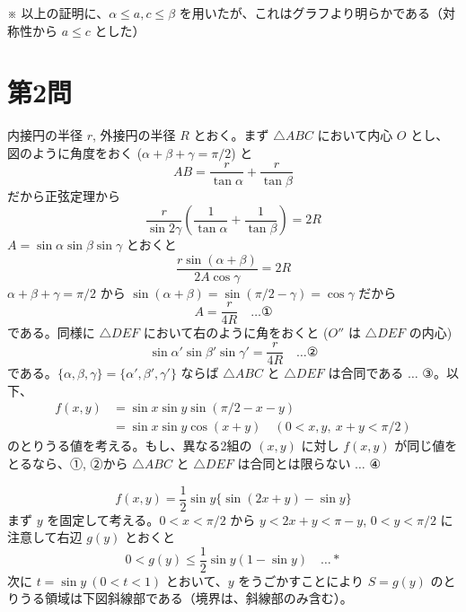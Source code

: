 \documentclass[../main.tex]{subfiles}
\begin{document}
\begin{center}
\end{center}
\noindent
※ 以上の証明に、$\alpha \le a, c \le \beta$ を用いたが、これはグラフより明らかである（対称性から $a \le c$ とした）

\newpage

\section*{第2問}

\noindent
[\textbf{解}] 内接円の半径 $r$, 外接円の半径 $R$ とおく。まず $\triangle ABC$ において内心 $O$ とし、図のように角度をおく ($\alpha+\beta+\gamma = \pi/2$) と
\[
  AB = \frac{r}{\tan \alpha} + \frac{r}{\tan \beta}
\]
だから正弦定理から
\[
  \frac{r}{\sin 2\gamma} \left( \frac{1}{\tan \alpha} + \frac{1}{\tan \beta} \right) = 2R
\]
$A = \sin \alpha \sin \beta \sin \gamma$ とおくと
\[
  \frac{r \sin(\alpha+\beta)}{2A \cos \gamma} = 2R
\]
$\alpha+\beta+\gamma = \pi/2$ から $\sin(\alpha+\beta) = \sin(\pi/2-\gamma) = \cos \gamma$ だから
\[
  A = \frac{r}{4R} \quad \dots \text{①}
\]
である。同様に $\triangle DEF$ において右のように角をおくと ($O''$ は $\triangle DEF$ の内心)
\[
  \sin \alpha' \sin \beta' \sin \gamma' = \frac{r}{4R} \quad \dots \text{②}
\]
である。$\{\alpha, \beta, \gamma\} = \{\alpha', \beta', \gamma'\}$ ならば $\triangle ABC$ と $\triangle DEF$ は合同である $\dots$ ③。以下、
\begin{align*}
  f(x, y) &= \sin x \sin y \sin(\pi/2 - x - y) \\
  &= \sin x \sin y \cos(x+y) \quad (0 < x, y, \ x+y < \pi/2)
\end{align*}
のとりうる値を考える。もし、異なる2組の $(x,y)$ に対し $f(x,y)$ が同じ値をとるなら、①, ②から $\triangle ABC$ と $\triangle DEF$ は合同とは限らない $\dots$ ④

\[
  f(x,y) = \frac{1}{2} \sin y \{ \sin(2x+y) - \sin y \}
\]
まず $y$ を固定して考える。$0 < x < \pi/2$ から $y < 2x+y < \pi-y$, $0 < y < \pi/2$ に注意して右辺 $g(y)$ とおくと
\[
  0 < g(y) \le \frac{1}{2} \sin y (1 - \sin y) \quad \dots *
\]
次に $t = \sin y \ (0 < t < 1)$ とおいて、$y$ をうごかすことにより $S = g(y)$ のとりうる領域は下図斜線部である（境界は、斜線部のみ含む）。
\end{document}
